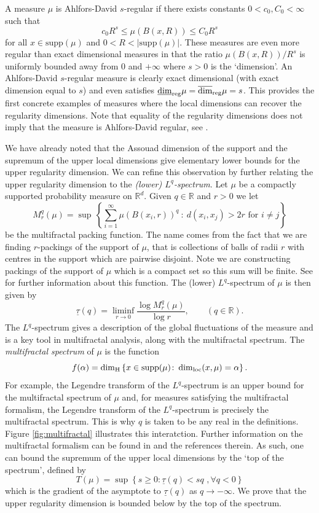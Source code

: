 A measure $\mu$ is Ahlfors-David $s$-regular if there exists constants $0<c_0,C_0< \infty$ such that 
\[
c_0 R^s \le \mu(B(x,R)) \le C_0 R^s
\]
for all $x\in \text{supp}(\mu)$ and $0 < R < \lvert \text{supp}(\mu) \rvert$.
These measures are even more regular than exact dimensional measures in that the ratio $\mu(B(x,R))/R^s$ is uniformly bounded away from 0 and $+\infty$ where $s >0$ is the `dimension'. An Ahlfors-David $s$-regular measure is clearly exact dimensional (with exact dimension equal to $s$) and even satisfies $\underline{\dim}_{\textup{reg}} \mu = \overline{\dim}_{\textup{reg}} \mu = s$. This provides the first concrete examples of measures where the local dimensions can recover the regularity dimensions. Note that equality of the regularity dimensions does not imply that the measure is Ahlfors-David regular, see \cite{hare-troscheit}.




We have already noted that the Assouad dimension of the support and the supremum of the upper local dimensions give elementary lower bounds for the upper regularity dimension.  We can refine this observation by further relating the upper regularity dimension to the \textit{(lower) $L^q$-spectrum}.  Let $\mu$ be a compactly supported probability measure on $\mathbb{R}^d$.  Given $q \in \mathbb{R}$ and $r>0$ we let
\[
M_r^q(\mu) = \sup  \, \left \{ \sum_{i=1}^\infty  \mu(B(x_i,r))^q \ : \ d(x_i, x_j) > 2r \text{ for $i \neq j$} \right\}
\]
be the multifractal packing function. The name comes from the fact that we are finding $r$-packings of the support of $\mu$, that is collections of balls of radii $r$ with centres in the support which are pairwise disjoint. Note we are constructing packings of the support of $\mu$ which is a compact set so this sum will be finite. See \cite{olsenformalism} for further information about this function. The  (lower) $L^q$-spectrum of $\mu$ is then given by
\[
\underline{\tau}(q)= \liminf_{r\rightarrow 0} \frac{\log M_r^q(\mu) }{\log r}, \qquad (q\in \mathbb{R}).
\]
The $L^q$-spectrum gives a description of the global fluctuations of the measure and is a key tool in multifractal analysis, along with the multifractal spectrum. The \textit{multifractal spectrum} of $\mu$ is the function 
\[
f(\alpha) = \dim_{\text{H}} \left\{ x\in \text{supp} (\mu) \colon \dim_{\textup{loc}}(x,\mu) = \alpha \right\}.
\]
For example, the Legendre transform of the $L^q$-spectrum is an upper bound for the multifractal spectrum of $\mu$ and, for measures satisfying the multifractal formalism, the Legendre transform of the $L^q$-spectrum is precisely the multifractal spectrum. This is why $q$ is taken to be any real in the definitions. Figure \ref{fig:multifractal} illustrates this interatction. Further information on the multifractal formalism can be found in \cite{olsenformalism} and the references therein. As such, one can bound the supremum of the upper local dimensions by the `top of the spectrum', defined by
\[
T(\mu)=\sup \left\{ s \ge 0 \colon \underline{\tau}(q) < sq \, \,, \forall q<0 \right\}
\]
which is the gradient of the asymptote to $\underline{\tau}(q)$ as $q \rightarrow - \infty$.  We prove that the upper regularity dimension is bounded below by the top of the spectrum.  



